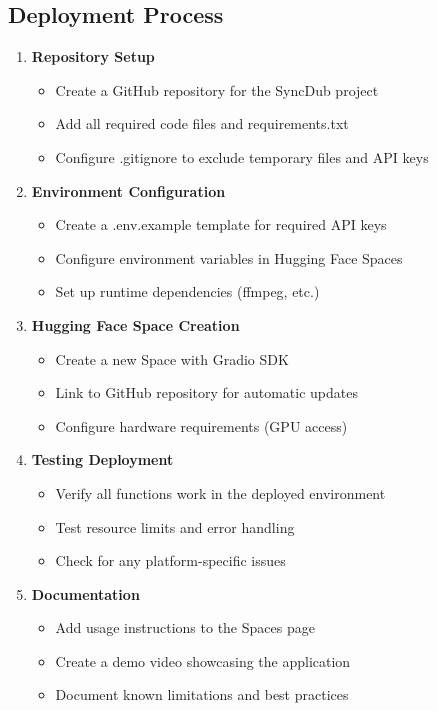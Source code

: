 \documentclass[11pt,a4paper]{article}
\begin{document}
\subsection{Deployment Process}

\begin{enumerate}
    \item \textbf{Repository Setup}
    \begin{itemize}
        \item Create a GitHub repository for the SyncDub project
        \item Add all required code files and requirements.txt
        \item Configure .gitignore to exclude temporary files and API keys
    \end{itemize}
    
    \item \textbf{Environment Configuration}
    \begin{itemize}
        \item Create a .env.example template for required API keys
        \item Configure environment variables in Hugging Face Spaces
        \item Set up runtime dependencies (ffmpeg, etc.)
    \end{itemize}
    
    \item \textbf{Hugging Face Space Creation}
    \begin{itemize}
        \item Create a new Space with Gradio SDK
        \item Link to GitHub repository for automatic updates
        \item Configure hardware requirements (GPU access)
    \end{itemize}
    
    \item \textbf{Testing Deployment}
    \begin{itemize}
        \item Verify all functions work in the deployed environment
        \item Test resource limits and error handling
        \item Check for any platform-specific issues
    \end{itemize}
    
    \item \textbf{Documentation}
    \begin{itemize}
        \item Add usage instructions to the Spaces page
        \item Create a demo video showcasing the application
        \item Document known limitations and best practices
    \end{itemize}
\end{enumerate}
\end{document}
